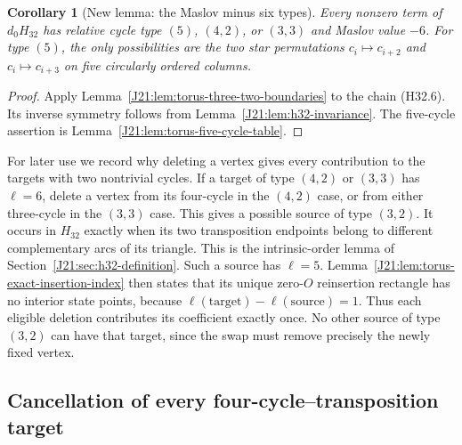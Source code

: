 \documentclass[11pt,oneside]{report}
\newtheorem{corollary}[theorem]{Corollary}
\theoremstyle{definition}
\numberwithin{equation}{section}
\begin{document}
\begin{corollary}[New lemma: the Maslov minus six types]
\label{J21:lem:m6-types}
Every nonzero term of $d_0H_{32}$ has relative cycle type $(5)$,
$(4,2)$, or $(3,3)$ and Maslov value $-6$. For type $(5)$, the
only possibilities are the two star permutations $c_i\mapsto c_{i+2}$
and $c_i\mapsto c_{i+3}$ on five circularly ordered columns.
\end{corollary}
\begin{proof}
Apply Lemma~\ref{J21:lem:torus-three-two-boundaries} to the chain (H32.6).
Its inverse symmetry follows from Lemma~\ref{J21:lem:h32-invariance}.
The five-cycle assertion is Lemma~\ref{J21:lem:torus-five-cycle-table}.
\end{proof}

For later use we record why deleting a vertex gives every contribution
to the targets with two nontrivial cycles.
If a target of type $(4,2)$ or $(3,3)$ has $\ell=6$, delete a vertex from its four-cycle in the $(4,2)$ case, or from
either three-cycle in the $(3,3)$ case. This gives a possible
source of type $(3,2)$.
It occurs in $H_{32}$ exactly when its two transposition endpoints
belong to different complementary arcs of its triangle.
This is the intrinsic-order lemma of
Section~\ref{J21:sec:h32-definition}. Such a source has $\ell=5$.
Lemma~\ref{J21:lem:torus-exact-insertion-index} then states that its unique zero-$O$ reinsertion
rectangle has no interior state points, because
$\ell(\text{target})-\ell(\text{source})=1$.
Thus each eligible deletion contributes its coefficient exactly once.
No other source of type $(3,2)$ can have that target, since the swap
must remove precisely the newly fixed vertex.

\subsection{Cancellation of every four-cycle--transposition target}
\end{document}
